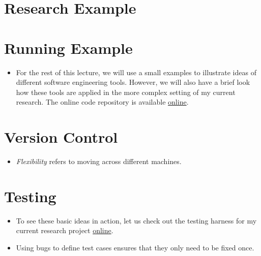 \section{Research Example}


\section{Running Example}
\begin{itemize}
\item For the rest of this lecture, we will use a small examples to illustrate ideas of different software engineering tools. However, we will also have a brief look how these tools are applied in the more complex setting of my current research. The online code repository is available \href{https://github.com/robustToolbox/package}{online}.
\end{itemize}

\section{Version Control}

\begin{itemize}
\item \textit{Flexibility} refers to moving across different machines.
\end{itemize}

\nocite{Bilschak.2016}

\section{Testing}
\begin{itemize}
\item To see these basic ideas in action, let us check out the testing harness for my current research project \href{https://github.com/robustToolbox/package/tree/master/development/tests}{online}.
\item Using bugs to define test cases ensures that they only need to be fixed once.
\end{itemize}


